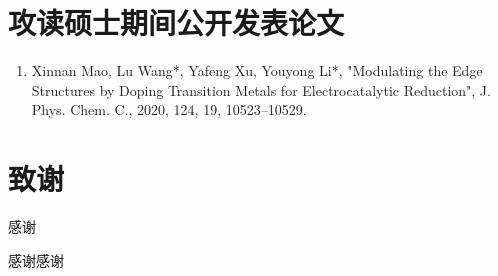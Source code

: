 \chapter{攻读硕士期间公开发表论文}

{
\setlist[enumerate]{}%
\begin{enumerate}[nosep]
    \item Xinnan Mao, Lu Wang*, Yafeng Xu, Youyong Li*, "Modulating the  Edge Structures by Doping Transition Metals for Electrocatalytic  Reduction", J. Phys. Chem. C., 2020, 124, 19, 10523–10529.
\end{enumerate}
}

\chapter[致谢]{致\quad 谢}%

感谢

感谢感谢

